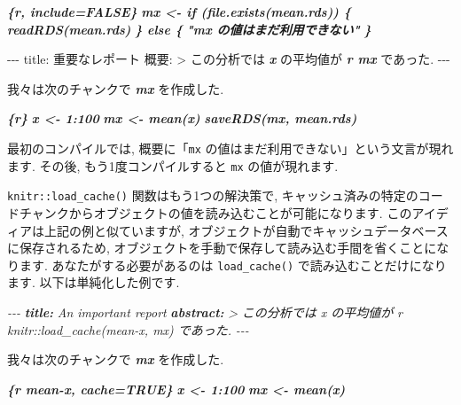 \documentclass[
  11pt,
]{bxjsreport}
\newenvironment{Shaded}{\begin{snugshade}}{\end{snugshade}}
\newcommand{\AnnotationTok}[1]{\textcolor[rgb]{0.56,0.35,0.01}{\textbf{\textit{#1}}}}
\newcommand{\CommentTok}[1]{\textcolor[rgb]{0.56,0.35,0.01}{\textit{#1}}}
\newcommand{\InformationTok}[1]{\textcolor[rgb]{0.56,0.35,0.01}{\textbf{\textit{#1}}}}
\newcommand{\NormalTok}[1]{#1}
\begin{document}
\begin{Shaded}
\begin{Highlighting}[]
\InformationTok{\textasciigrave{}\textasciigrave{}\textasciigrave{}\{r, include=FALSE\}}
\InformationTok{mx \textless{}{-} if (file.exists(\textquotesingle{}mean.rds\textquotesingle{})) \{}
\InformationTok{  readRDS(\textquotesingle{}mean.rds\textquotesingle{})}
\InformationTok{\} else \{}
\InformationTok{  "\textasciigrave{}mx\textasciigrave{} の値はまだ利用できない"}
\InformationTok{\}}
\InformationTok{\textasciigrave{}\textasciigrave{}\textasciigrave{}}

\NormalTok{{-}{-}{-}}
\NormalTok{title: 重要なレポート}
\NormalTok{概要: \textgreater{}}
\NormalTok{  この分析では }\InformationTok{\textasciigrave{}x\textasciigrave{}}\NormalTok{ の平均値が}
  \InformationTok{\textasciigrave{}r mx\textasciigrave{}}\NormalTok{ であった.}
\NormalTok{{-}{-}{-}}

\NormalTok{我々は次のチャンクで }\InformationTok{\textasciigrave{}mx\textasciigrave{}}\NormalTok{ を作成した.}

\InformationTok{\textasciigrave{}\textasciigrave{}\textasciigrave{}\{r\}}
\InformationTok{x \textless{}{-} 1:100}
\InformationTok{mx \textless{}{-} mean(x)}
\InformationTok{saveRDS(mx, \textquotesingle{}mean.rds\textquotesingle{})}
\InformationTok{\textasciigrave{}\textasciigrave{}\textasciigrave{}}
\end{Highlighting}
\end{Shaded}

最初のコンパイルでは, 概要に「\texttt{mx} の値はまだ利用できない」という文言が現れます. その後, もう1度コンパイルすると \texttt{mx} の値が現れます.

\texttt{knitr::load\_cache()} 関数はもう1つの解決策で, キャッシュ済みの特定のコードチャンクからオブジェクトの値を読み込むことが可能になります. このアイディアは上記の例と似ていますが, オブジェクトが自動でキャッシュデータベースに保存されるため, オブジェクトを手動で保存して読み込む手間を省くことになります. あなたがする必要があるのは \texttt{load\_cache()} で読み込むことだけになります. 以下は単純化した例です.

\begin{Shaded}
\begin{Highlighting}[]
\CommentTok{{-}{-}{-}}
\AnnotationTok{title:}\CommentTok{ An important report}
\AnnotationTok{abstract:}\CommentTok{ \textgreater{}}
\CommentTok{  この分析では \textasciigrave{}x\textasciigrave{} の平均値が}
\CommentTok{  \textasciigrave{}r knitr::load\_cache(\textquotesingle{}mean{-}x\textquotesingle{}, \textquotesingle{}mx\textquotesingle{})\textasciigrave{} であった.}
\CommentTok{{-}{-}{-}}

\NormalTok{我々は次のチャンクで }\InformationTok{\textasciigrave{}mx\textasciigrave{}}\NormalTok{ を作成した.}

\InformationTok{\textasciigrave{}\textasciigrave{}\textasciigrave{}\{r mean{-}x, cache=TRUE\}}
\InformationTok{x \textless{}{-} 1:100}
\InformationTok{mx \textless{}{-} mean(x)}
\InformationTok{\textasciigrave{}\textasciigrave{}\textasciigrave{}}
\end{Highlighting}
\end{Shaded}
\end{document}
